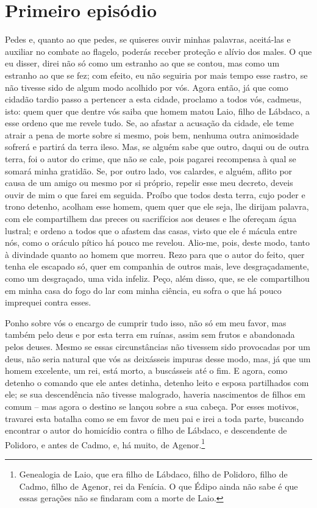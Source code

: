 \pagebreak
\section{Primeiro episódio}


   Pedes e, quanto ao que pedes, se quiseres ouvir minhas palavras,
aceitá-las e auxiliar no combate ao flagelo, poderás receber proteção e
alívio dos males. O que eu disser, direi não só como um estranho ao que
se contou, mas como um estranho ao que se fez; com efeito, eu não
seguiria por mais tempo esse rastro, se não tivesse sido de algum modo
acolhido por vós. Agora então, já que como cidadão tardio passo a
pertencer a esta cidade, proclamo a todos vós, cadmeus, isto: quem quer
que dentre vós saiba que homem matou Laio, filho de Lábdaco, a esse
ordeno que me revele tudo. Se, ao afastar a acusação da cidade, ele teme
atrair a pena de morte sobre si mesmo, pois bem, nenhuma outra
animosidade sofrerá e partirá da terra ileso. Mas, se alguém sabe
que outro, daqui ou de outra terra, foi o autor do crime, que não se
cale, pois pagarei recompensa à qual se somará minha gratidão. Se, por
outro lado, vos calardes, e alguém, aflito por causa de um amigo ou
mesmo por si próprio, repelir esse meu decreto, deveis ouvir de mim o
que farei em seguida. Proíbo que todos desta terra, cujo poder e trono
detenho, acolham esse homem, quem quer que ele seja, lhe dirijam
palavra, com ele compartilhem das preces ou sacrifícios aos deuses e lhe
ofereçam água lustral; e ordeno a todos que o afastem das casas,
visto que ele é mácula entre nós, como o oráculo pítico há pouco me
revelou. Alio-me, pois, deste modo, tanto à divindade quanto ao homem
que morreu. Rezo para que o autor do feito, quer tenha ele escapado só,
quer em companhia de outros mais, leve desgraçadamente, como um
desgraçado, uma vida infeliz. Peço, além disso, que, se ele compartilhou
em minha casa do fogo do lar com minha ciência, eu sofra o que há
pouco imprequei contra esses.

Ponho sobre vós o encargo de cumprir tudo isso, não só em meu favor, mas
também pelo deus e por esta terra em ruínas, assim sem frutos e
abandonada pelos deuses. Mesmo se essas circunstâncias não tivessem sido
provocadas por um deus, não seria natural que vós as deixásseis impuras
desse modo, mas, já que um homem excelente, um rei, está morto, a
buscásseis até o fim. E agora, como detenho o comando que ele
antes detinha, detenho leito e esposa partilhados com ele; se sua
descendência não tivesse malogrado, haveria nascimentos de filhos em
comum -- mas agora o destino se lançou sobre a sua cabeça. Por esses
motivos, travarei esta batalha como se em favor de meu pai e irei a toda
parte, buscando encontrar o autor do homicídio contra o filho de
Lábdaco, e descendente de Polidoro, e antes de Cadmo, e, há muito, de
Agenor.\footnote{Genealogia de Laio, que era filho de Lábdaco, filho de
  Polidoro, filho de Cadmo, filho de Agenor, rei da Fenícia. O que Édipo
  ainda não sabe é que essas gerações não se findaram com a morte de
  Laio.}

